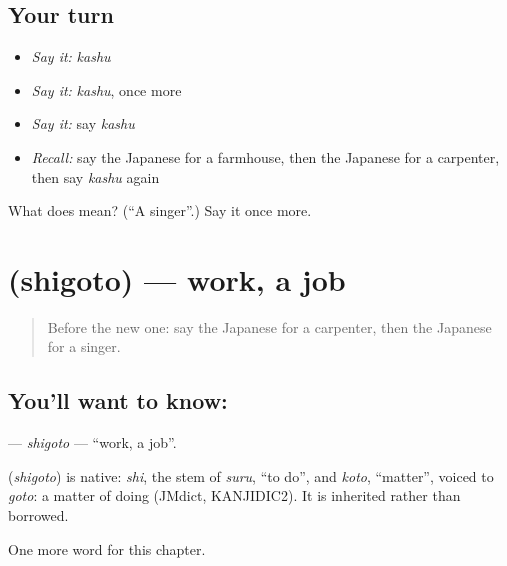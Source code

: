 \subsection*{Your turn}
\begin{itemize}
\raggedright
  \item \emph{Say it:} \emph{kashu}
  \item \emph{Say it:} \emph{kashu}, once more
  \item \emph{Say it:} say \emph{kashu}
  \item \emph{Recall:} say the Japanese for a farmhouse, then the Japanese for a carpenter, then say \emph{kashu} again
\end{itemize}

\begin{tcolorbox}[breakable,colback=teal!4,colframe=teal!35!black,title={Before you move on}]
What does  mean? (\textquotedblleft{}A singer\textquotedblright{}.) Say it once more.
\end{tcolorbox}
\section[\texorpdfstring{\ja{しごと} (shigoto)}{しごと (shigoto)}]{ (shigoto) — work, a job}

\label{lesson:JA-C112-shigoto}



\begin{quote}
Before the new one: say the Japanese for a carpenter, then the Japanese for a singer.
\end{quote}

\subsection*{You'll want to know: }
\textbf{} — \emph{shigoto} — \textquotedblleft{}work, a job\textquotedblright{}.

\begin{cousinweb}
\textbf{} (\emph{shigoto}) is native: \emph{shi}, the stem of \emph{suru}, \textquotedblleft{}to do\textquotedblright{}, and \emph{koto}, \textquotedblleft{}matter\textquotedblright{}, voiced to \emph{goto}: a matter of doing (JMdict, KANJIDIC2). It is inherited rather than borrowed.
\end{cousinweb}

\begin{grammarlens}[title={What you've built}]
One more word for this chapter.
\end{grammarlens}

